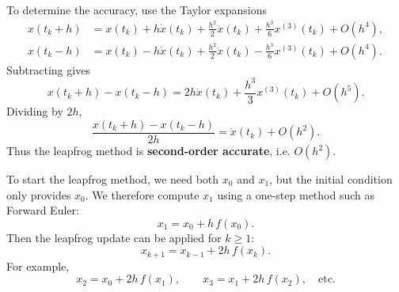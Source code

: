\documentclass[11pt]{article}
\begin{document}
To determine the accuracy, use the Taylor expansions
\begin{align}
x(t_k+h) &= x(t_k)+h\dot{x}(t_k)+\frac{h^2}{2}\ddot{x}(t_k)+\frac{h^3}{6}x^{(3)}(t_k)+O(h^4),\\
x(t_k-h) &= x(t_k)-h\dot{x}(t_k)+\frac{h^2}{2}\ddot{x}(t_k)-\frac{h^3}{6}x^{(3)}(t_k)+O(h^4).
\end{align}
Subtracting gives
\begin{equation}
x(t_k+h)-x(t_k-h)=2h\dot{x}(t_k)+\frac{h^3}{3}x^{(3)}(t_k)+O(h^5).
\end{equation}
Dividing by $2h$,
\begin{equation}
\frac{x(t_k+h)-x(t_k-h)}{2h}=\dot{x}(t_k)+O(h^2).
\end{equation}
Thus the leapfrog method is \textbf{second-order accurate}, i.e. \(O(h^2)\).

To start the leapfrog method, we need both $x_0$ and $x_1$, but the initial condition only provides $x_0$. We therefore compute $x_1$ using a one-step method such as Forward Euler:
\begin{equation}
\boxed{x_1=x_0+h\,f(x_0).}
\end{equation}
Then the leapfrog update can be applied for $k\geq 1$:
\begin{equation}
\boxed{x_{k+1}=x_{k-1}+2h\,f(x_k).}
\end{equation}
For example,
\begin{equation}
x_2=x_0+2h\,f(x_1), \qquad x_3=x_1+2h\,f(x_2), \quad \text{etc.}
\end{equation}
\end{document}
